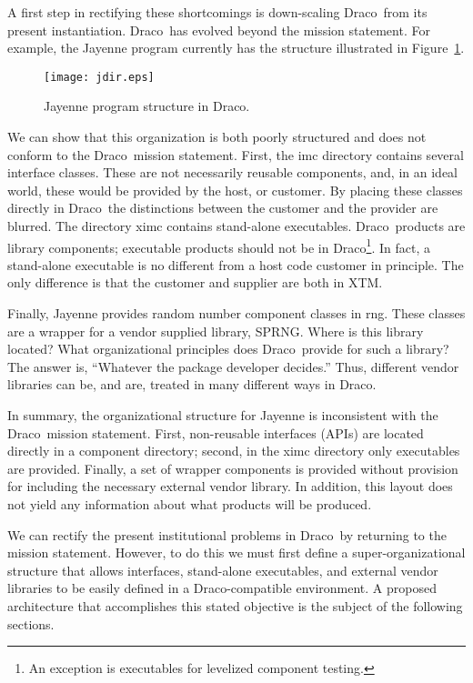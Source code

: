 \documentclass[11pt]{../tex/rnote}
\newcommand{\draco}{\textsf{Draco}}
\newcommand{\pkg}[1]{\textsf{#1}}
\begin{document}
A first step in rectifying these shortcomings is down-scaling \draco\ 
from its present instantiation.  \draco\ has evolved beyond the
mission statement.  For example, the \pkg{Jayenne} program currently
has the structure illustrated in Figure~\ref{fig:Jayenne}.
\begin{figure}
  \centerline{\texttt{[image: jdir.eps]}}
  \caption{\pkg{Jayenne} program structure in \draco.}
  \label{fig:Jayenne}
\end{figure}
We can show that this organization is both poorly structured and does
not conform to the \draco\ mission statement.  First, the \pkg{imc}
directory contains several interface classes.  These are not
necessarily reusable components, and, in an ideal world, these would
be provided by the host, or customer.  By placing these classes
directly in \draco\ the distinctions between the customer and the
provider are blurred.  The directory \pkg{ximc} contains stand-alone
executables.  \draco\ products are library components; executable
products should not be in \draco\footnote{An exception is executables
  for levelized component testing.}.  In fact, a stand-alone
executable is no different from a host code customer in principle.
The only difference is that the customer and supplier are both in XTM.

Finally, \pkg{Jayenne} provides random number component classes in
\pkg{rng}.  These classes are a wrapper for a vendor supplied library,
\pkg{SPRNG}.  Where is this library located?  What organizational
principles does \draco\ provide for such a library?  The answer is,
``Whatever the package developer decides.''  Thus, different vendor
libraries can be, and are, treated in many different ways in \draco.

In summary, the organizational structure for \pkg{Jayenne} is
inconsistent with the \draco\ mission statement.  First, non-reusable
interfaces (APIs) are located directly in a component directory;
second, in the \pkg{ximc} directory only executables are provided.
Finally, a set of wrapper components is provided without provision for
including the necessary external vendor library.  In addition,
this layout does not yield any information about what products will
be produced.

We can rectify the present institutional problems in \draco\ by
returning to the mission statement.  However, to do this we must first 
define a super-organizational structure that allows interfaces,
stand-alone executables, and external vendor libraries to be easily
defined in a \draco-compatible environment.  A proposed architecture
that accomplishes this stated objective is the subject of the
following sections.
\end{document}
